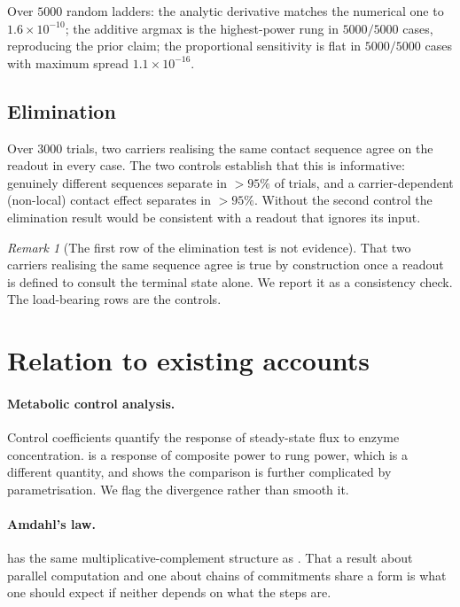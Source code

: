 \documentclass[11pt,a4paper]{article}
\theoremstyle{clthm}
\theoremstyle{definition}
\theoremstyle{remark}
\newtheorem{remark}[theorem]{Remark}
\begin{document}
Over $5000$ random ladders: the analytic derivative matches the numerical
one to $1.6\times10^{-10}$; the additive argmax is the highest-power rung
in $5000/5000$ cases, reproducing the prior claim; the proportional
sensitivity is flat in $5000/5000$ cases with maximum spread
$1.1\times10^{-16}$.

\subsection{Elimination}

Over $3000$ trials, two carriers realising the same contact sequence agree
on the readout in every case. The two controls establish that this is
informative: genuinely different sequences separate in $>95\%$ of trials,
and a carrier-dependent (non-local) contact effect separates in $>95\%$.
Without the second control the elimination result would be consistent with
a readout that ignores its input.

\begin{remark}[The first row of the elimination test is not evidence]
\label{rem:elim-tautology}
That two carriers realising the same sequence agree is true by
construction once a readout is defined to consult the terminal state
alone. We report it as a consistency check. The load-bearing rows are the
controls.
\end{remark}

\section{Relation to existing accounts}
\label{sec:related}

\paragraph{Metabolic control analysis.} Control coefficients
\citep{kacser1973,heinrich1974} quantify the response of steady-state flux
to enzyme concentration.  is a response of composite
power to rung power, which is a different quantity, and
 shows the comparison is further complicated by
parametrisation. We flag the divergence rather than smooth it.

\paragraph{Amdahl's law.} \citet{amdahl1967} has the same
multiplicative-complement structure as . That a result
about parallel computation and one about chains of commitments share a
form is what one should expect if neither depends on what the steps are.
\end{document}
